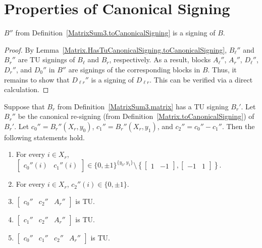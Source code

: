 \section{Properties of Canonical Signing}

\begin{lemma}
    \label{lem:three_sum_signing_B_valid}
    \leanok
    $B''$ from Definition~\ref{MatrixSum3.toCanonicalSigning} is a signing of $B$.
\end{lemma}

\begin{proof}
    By Lemma~\ref{Matrix.HasTuCanonicalSigning.toCanonicalSigning}, $B_{\ell}''$ and $B_{r}''$ are TU signings of $B_{\ell}$ and $B_{r}$, respectively. As a result, blocks $A_{\ell}''$, $A_{r}''$, $D_{\ell}''$, $D_{r}''$, and $D_{0}''$ in $B''$ are signings of the corresponding blocks in $B$. Thus, it remains to show that $D_{\ell r}''$ is a signing of $D_{\ell r}$. This can be verified via a direct calculation. 
\end{proof}

\begin{lemma}
    \label{MatrixSum3.HasTuBr.cccAr_isTotallyUnimodular}
    \leanok
    Suppose that $B_{r}$ from Definition~\ref{MatrixSum3.matrix} has a TU signing $B_{r}'$. Let $B_{r}''$ be the canonical re-signing (from Definition~\ref{Matrix.toCanonicalSigning}) of $B_{r}'$. Let $c_{0}'' = B_{r}'' (X_{r}, y_{0})$, $c_{1}'' = B_{r}'' (X_{r}, y_{1})$, and $c_{2}'' = c_{0}'' - c_{1}''$. Then the following statements hold.
    \begin{enumerate}
        \item\label{item:tss_Brp_c01} For every $i \in X_{r}$, $\begin{bmatrix} c_{0}'' (i) & c_{1}'' (i) \end{bmatrix} \in \{0, \pm 1\}^{\{y_{0}, y_{1}\}} \setminus \left\{ \begin{bmatrix} 1 & -1 \end{bmatrix}, \begin{bmatrix} -1 & 1 \end{bmatrix} \right\}$.
        \item\label{item:tss_Brp_c2} For every $i \in X_{r}$, $c_{2}'' (i) \in \{0, \pm 1\}$.
        \item\label{item:tss_Brp_tu1} $\begin{bmatrix} c_{0}'' & c_{2}'' & A_{r}'' \end{bmatrix}$ is TU.
        \item\label{item:tss_Brp_tu2} $\begin{bmatrix} c_{1}'' & c_{2}'' & A_{r}'' \end{bmatrix}$ is TU.
        \item\label{item:tss_Brp_tu3} $\begin{bmatrix} c_{0}'' & c_{1}'' & c_{2}'' & A_{r}'' \end{bmatrix}$ is TU.
    \end{enumerate}
\end{lemma}

